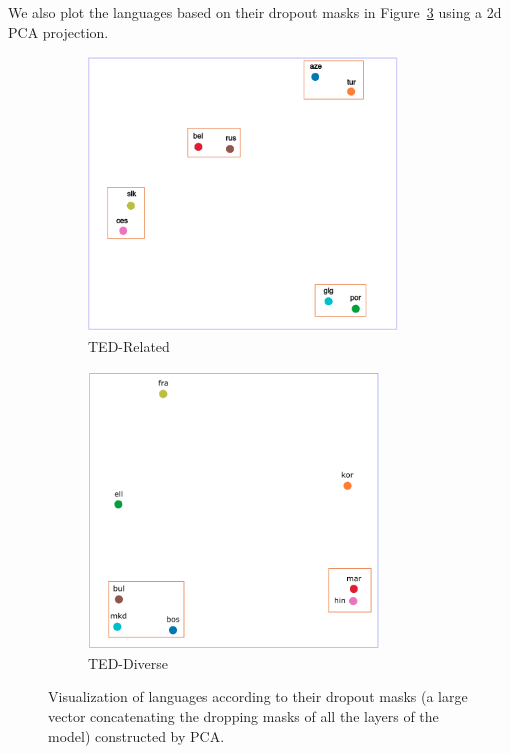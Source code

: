 \documentclass[11pt]{article}
\begin{document}
We also plot the languages based on their dropout masks in Figure~\ref{fig:visual} using a 2d PCA projection.
\begin{figure}[htbp]
\begin{subfigure}{0.5\textwidth}
  \centering
  \includegraphics[width=0.9\textwidth]{ted_related}  
  \caption{TED-Related}
  \label{fig:visual-related}
\end{subfigure}
\begin{subfigure}{0.5\textwidth}
  \centering
  \includegraphics[width=0.85\textwidth]{ted_diverse}  
  \caption{TED-Diverse}
  \label{fig:visual-diverse}
\end{subfigure}
\caption{Visualization of languages according to their dropout masks (a large vector concatenating the dropping masks of all the layers of the model) constructed by PCA.}
\label{fig:visual}
\end{figure}
\end{document}
